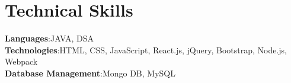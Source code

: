 \section{Technical Skills}
    \begin{itemize}[leftmargin=0.15in, label={}]
	\small{\item{
		\textbf{Languages}{:JAVA, DSA} \\

		\textbf{Technologies}{:HTML, CSS, JavaScript, React.js, jQuery, Bootstrap, Node.js, Webpack } \\

		\textbf{Database Management}{:Mongo DB, MySQL }
	}}
    \end{itemize}
